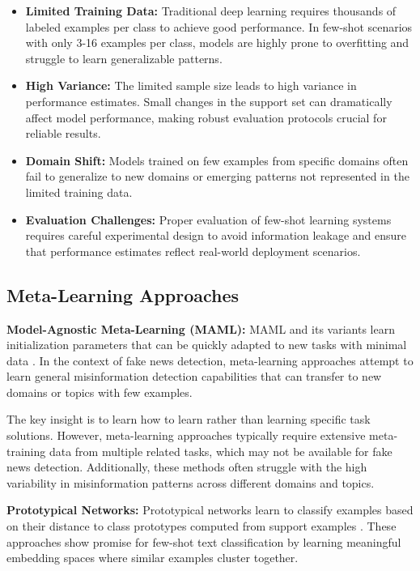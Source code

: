 \begin{itemize}
\item \textbf{Limited Training Data:} Traditional deep learning requires thousands of labeled examples per class to achieve good performance. In few-shot scenarios with only 3-16 examples per class, models are highly prone to overfitting and struggle to learn generalizable patterns.
\item \textbf{High Variance:} The limited sample size leads to high variance in performance estimates. Small changes in the support set can dramatically affect model performance, making robust evaluation protocols crucial for reliable results.
\item \textbf{Domain Shift:} Models trained on few examples from specific domains often fail to generalize to new domains or emerging patterns not represented in the limited training data.
\item \textbf{Evaluation Challenges:} Proper evaluation of few-shot learning systems requires careful experimental design to avoid information leakage and ensure that performance estimates reflect real-world deployment scenarios.
\end{itemize}

\subsection{Meta-Learning Approaches}

\textbf{Model-Agnostic Meta-Learning (MAML):} MAML and its variants learn initialization parameters that can be quickly adapted to new tasks with minimal data \cite{finn2017model, bansal2020self}. In the context of fake news detection, meta-learning approaches attempt to learn general misinformation detection capabilities that can transfer to new domains or topics with few examples.

The key insight is to learn how to learn rather than learning specific task solutions. However, meta-learning approaches typically require extensive meta-training data from multiple related tasks, which may not be available for fake news detection. Additionally, these methods often struggle with the high variability in misinformation patterns across different domains and topics.

\textbf{Prototypical Networks:} Prototypical networks learn to classify examples based on their distance to class prototypes computed from support examples \cite{snell2017prototypical, gao2019fewrel}. These approaches show promise for few-shot text classification by learning meaningful embedding spaces where similar examples cluster together.


